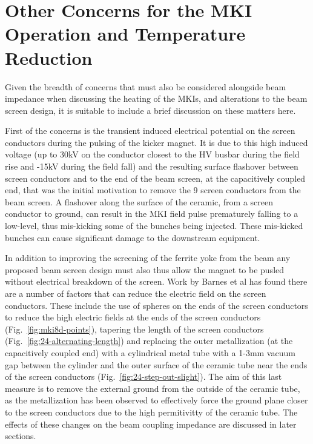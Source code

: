 \section{Other Concerns for the MKI Operation and Temperature Reduction}

Given the breadth of concerns that must also be considered alongside beam impedance when discussing the heating of the MKIs, and alterations to the beam screen design, it is suitable to include a brief discussion on these matters here. 

First of the concerns is the transient induced electrical potential on the screen conductors during the pulsing of the kicker magnet. It is due to this high induced voltage (up to 30kV on the conductor closest to the HV busbar during the field rise and -15kV during the field fall) and the resulting surface flashover between screen conductors and to the end of the beam screen, at the capacitively coupled end, that was the initial motivation to remove the 9 screen conductors from the beam screen. A flashover along the surface of the ceramic, from a screen conductor to ground, can result in the MKI field pulse prematurely falling to a low-level, thus mis-kicking some of the bunches being injected. These mis-kicked bunches can cause significant damage to the downstream equipment.

In addition to improving the screening of the ferrite yoke from the beam any proposed beam screen design must also thus allow the magnet to be pusled without electrical breakdown of the screen. Work by Barnes et al \cite{Barnes:eFieldMKI} has found there are a number of factors that can reduce the electric field on the screen conductors. These include the use of spheres on the ends of the screen conductors to reduce the high electric fields at the ends of the screen conductors (Fig.~\ref{fig:mki8d-points}), tapering the length of the screen conductors (Fig.~\ref{fig:24-alternating-length}) and replacing the outer metallization (at the capacitively coupled end) with a cylindrical metal tube with a 1-3mm vacuum gap between the cylinder and the outer surface of the ceramic tube near the ends of the screen conductors (Fig.~\ref{fig:24-step-out-slight}). The aim of this last measure is to remove the external ground from the outside of the ceramic tube, as the metallization has been observed to effectively force the ground plane closer to the screen conductors due to the high permitivitty of the ceramic tube. The effects of these changes on the beam coupling impedance are discussed in later sections.

